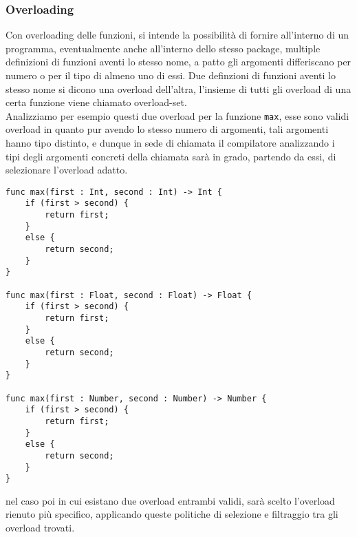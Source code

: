 \subsubsection{Overloading}
Con overloading delle funzioni, si intende la possibilità di fornire all’interno 
di un programma, eventualmente anche all’interno dello stesso package, multiple 
definizioni di funzioni aventi lo stesso nome, a patto gli argomenti differiscano 
per numero o per il tipo di almeno uno di essi. Due definzioni di funzioni 
aventi lo stesso nome si dicono una overload dell’altra, l’insieme di tutti 
gli overload di una certa funzione viene chiamato overload-set. \\

Analizziamo per esempio questi due overload per la funzione \texttt{max}, esse sono 
validi overload in quanto pur avendo lo stesso numero di argomenti, tali 
argomenti hanno tipo distinto, e dunque in sede di chiamata il compilatore 
analizzando i tipi degli argomenti concreti della chiamata sarà in grado, 
partendo da essi, di selezionare l’overload adatto. \\

\vspace{0.5cm}
\begin{lstlisting}[frame=single]
func max(first : Int, second : Int) -> Int { 
    if (first > second) {
        return first; 
    }
    else {
        return second;
    }
}

func max(first : Float, second : Float) -> Float {
    if (first > second) {
        return first; 
    }
    else {
        return second;
    }
}

func max(first : Number, second : Number) -> Number {
    if (first > second) {
        return first; 
    }
    else {
        return second;
    }
}
\end{lstlisting}
\vspace{0.5cm}

\newpage

nel caso poi in cui esistano due overload entrambi validi, sarà scelto l’overload rienuto 
più specifico, applicando queste politiche di selezione e filtraggio tra gli overload trovati.

